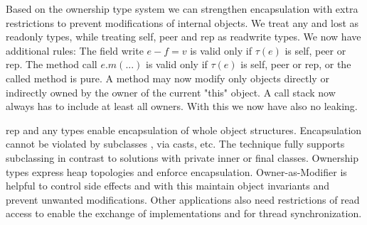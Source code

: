 \begin{mytitle} Based on the ownership type system we can strengthen encapsulation with extra restrictions to prevent modifications of internal objects. We treat any and lost as readonly types, while treating self, peer and rep as readwrite types. We now have additional rules: The field write $e-f = v$ is valid only if $\tau(e)$ is self, peer or rep. The method call $e.m(...)$ is valid only if $\tau(e)$ is self, peer or rep, or the called method is pure. A method may now modify only objects directly or indirectly owned by the owner of the current "this" object. A call stack now always has to include at least all owners. With this we now have also no leaking.
\end{mytitle}
\begin{mytitle}[Achievements] rep and any types enable encapsulation of whole object structures. Encapsulation cannot be violated by subclasses , via casts, etc. The technique fully supports subclassing in contrast to solutions with private inner or final classes. Ownership types express heap topologies and enforce encapsulation. Owner-as-Modifier is helpful to control side effects and with this maintain object invariants and prevent unwanted modifications. Other applications also need restrictions of read access to enable the exchange of implementations and for thread synchronization.
\end{mytitle}
